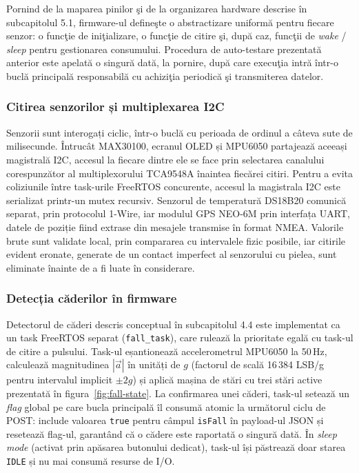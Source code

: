 \documentclass[12pt,a4paper]{article}
\begin{document}
Pornind de la maparea pinilor şi de la organizarea hardware descrise în subcapitolul 5.1, firmware-ul defineşte o abstractizare uniformă pentru fiecare senzor: o funcţie de iniţializare, o funcţie de citire şi, după caz, funcţii de \textit{wake} / \textit{sleep} pentru gestionarea consumului. Procedura de auto-testare prezentată anterior este apelată o singură dată, la pornire, după care execuţia intră într-o buclă principală responsabilă cu achiziţia periodică şi transmiterea datelor.

\subsubsection{Citirea senzorilor și multiplexarea I2C}

Senzorii sunt interogați ciclic, într-o buclă cu perioada de ordinul a câteva sute de milisecunde. Întrucât MAX30100, ecranul OLED și MPU6050 partajează aceeași magistrală I2C, accesul la fiecare dintre ele se face prin selectarea canalului corespunzător al multiplexorului TCA9548A înaintea fiecărei citiri. Pentru a evita coliziunile între task-urile FreeRTOS concurente, accesul la magistrala I2C este serializat printr-un mutex recursiv. Senzorul de temperatură DS18B20 comunică separat, prin protocolul 1-Wire, iar modulul GPS NEO-6M prin interfața UART, datele de poziție fiind extrase din mesajele transmise în format NMEA. Valorile brute sunt validate local, prin compararea cu intervalele fizic posibile, iar citirile evident eronate, generate de un contact imperfect al senzorului cu pielea, sunt eliminate înainte de a fi luate în considerare.

\subsubsection{Detecția căderilor în firmware}

Detectorul de căderi descris conceptual în subcapitolul 4.4 este implementat ca un task FreeRTOS separat (\texttt{fall\_task}), care rulează la prioritate egală cu task-ul de citire a pulsului. Task-ul eșantionează accelerometrul MPU6050 la 50\,Hz, calculează magnitudinea $|\vec{a}|$ în unități de $g$ (factorul de scală 16\,384 LSB/g pentru intervalul implicit $\pm 2g$) și aplică mașina de stări cu trei stări active prezentată în figura~\ref{fig:fall-state}. La confirmarea unei căderi, task-ul setează un \textit{flag} global pe care bucla principală îl consumă atomic la următorul ciclu de POST: include valoarea \texttt{true} pentru câmpul \texttt{isFall} în payload-ul JSON și resetează flag-ul, garantând că o cădere este raportată o singură dată. În \textit{sleep mode} (activat prin apăsarea butonului dedicat), task-ul își păstrează doar starea \texttt{IDLE} și nu mai consumă resurse de I/O.
\end{document}
